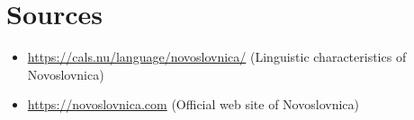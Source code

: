 \chapter{Sources}

\begin{itemize}
	\item \url{https://cals.nu/language/novoslovnica/} (Linguistic characteristics of Novoslovnica)
	\item \url{https://novoslovnica.com} (Official web site of Novoslovnica)
\end{itemize}
